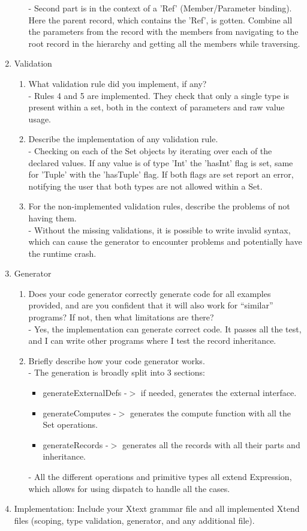 \documentclass[12pt]{article}
\begin{document}
\begin{enumerate}
\begin{enumerate}
    - Second part is in the context of a 'Ref' (Member/Parameter binding). Here the parent record, which contains the 'Ref', is gotten. Combine all the parameters from the record with the members from navigating to the root record in the hierarchy and getting all the members while traversing.
  \end{enumerate}
\item Validation
  \begin{enumerate}
  \item What validation rule did you implement, if any?\\
  - Rules 4 and 5 are implemented. They check that only a single type is present within a set, both in the context of parameters and raw value usage.
  \item Describe the implementation of any validation rule.\\
  - Checking on each of the Set objects by iterating over each of the declared values. If any value is of type 'Int' the 'hasInt' flag is set, same for 'Tuple' with the 'hasTuple' flag. If both flags are set report an error, notifying the user that both types are not allowed within a Set.
  \item For the non-implemented validation rules, describe the problems of not having them.\\
  - Without the missing validations, it is possible to write invalid syntax, which can cause the generator to encounter problems and potentially have the runtime crash.
  \end{enumerate}
\item Generator
  \begin{enumerate}
  \item Does your code generator correctly generate code for all examples provided, and are you confident that it will also work for ``similar'' programs? If not, then what limitations are there?\\
  - Yes, the implementation can generate correct code. It passes all the test, and I can write other programs where I test the record inheritance.
  \item Briefly describe how your code generator works.\\
  - The generation is broadly split into 3 sections:
  \begin{itemize}
    \item generateExternalDefs -\(>\)  if needed, generates the external interface.
    \item generateComputes -\(>\)  generates the compute function with all the Set operations.
    \item generateRecords -\(>\)  generates all the records with all their parts and inheritance.
  \end{itemize}
  - All the different operations and primitive types all extend Expression, which allows for using dispatch to handle all the cases.
  \end{enumerate}
\item Implementation: Include your Xtext grammar file and all implemented Xtend files (scoping, type validation, generator, and any additional file).
\end{enumerate}
\end{document}
